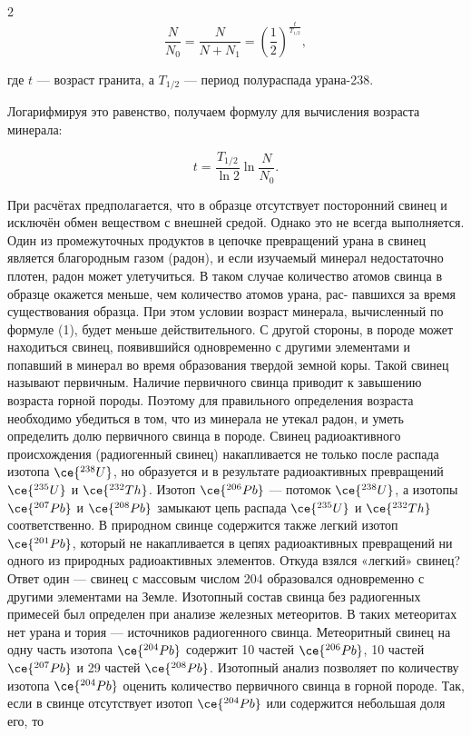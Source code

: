 \begin{multicols}{2}
\[
\frac{N}{N_0} = \frac{N}{N+N_1} = \left(\frac{1}{2}\right)^{\frac{t}{T_{1/2}}},
\]

где $t$ — возраст гранита, а $T_{1/2}$ — период полураспада урана-238.

Логарифмируя это равенство, получаем формулу для вычисления возраста минерала:

\[
t = \frac{T_{1/2}}{\ln 2} \ln \frac{N}{N_0}.
\]

При расчётах предполагается, что в образце отсутствует посторонний свинец и исключён обмен веществом с внешней средой. Однако это не всегда выполняется. Один из промежуточных продуктов в цепочке превращений урана в свинец является благородным газом (радон), и если изучаемый минерал недостаточно плотен, радон может улетучиться. В таком случае количество атомов свинца в образце окажется меньше, чем количество атомов урана, рас-
\newpage
павшихся за время существования
образца. При этом условии возраст
минерала, вычисленный по формуле (1), будет меньше действительного.
С другой стороны, в породе может
находиться свинец, появившийся одновременно с другими элементами
и попавший в минерал во время образования твердой земной коры. Такой свинец называют первичным. Наличие первичного свинца приводит
к завышению возраста горной породы. Поэтому для правильного определения возраста необходимо убедиться в том, что из минерала не
утекал радон, и уметь определить
долю первичного свинца в породе.
Свинец радиоактивного происхождения (радиогенный свинец) накапливается не только после распада изотопа $\ce{^{238}U}$, но образуется и в результате радиоактивных превращений
$\ce{^{235}U}$ и $\ce{^{232}Th}$. Изотоп $\ce{^{206}Pb}$ — потомок $\ce{^{238}U}$, а изотопы $\ce{^{207}Pb}$ и $\ce{^{208}Pb}$
замыкают цепь распада $\ce{^{235}U}$ и $\ce{^{232}Th}$
соответственно.
В природном свинце содержится
также легкий изотоп $\ce{^{201}Pb}$, который
не накапливается в цепях радиоактивных превращений ни одного из
природных радиоактивных элементов. Откуда взялся «легкий» свинец? Ответ один — свинец с массовым числом 204 образовался одновременно с другими элементами на
Земле.
Изотопный состав свинца без
радиогенных примесей был определен при анализе железных метеоритов. В таких метеоритах нет урана
и тория — источников радиогенного
свинца. Метеоритный свинец на одну
часть изотопа $\ce{^{204}Pb}$ содержит 10 частей $\ce{^{206}Pb}$, 10 частей $\ce{^{207}Pb}$ и 29 частей $\ce{^{208}Pb}$.
Изотопный анализ позволяет по
количеству изотопа $\ce{^{204}Pb}$ оценить количество первичного свинца в горной породе. Так, если в свинце
отсутствует изотоп $\ce{^{204}Pb}$ или содержится небольшая доля его, то

\end{multicols}

